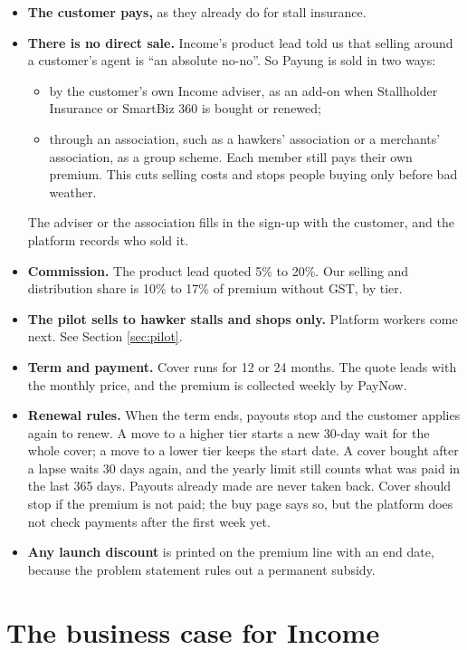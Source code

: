 \documentclass[11pt,a4paper]{article}
\begin{document}
\begin{itemize}[leftmargin=1.2em]
  \item \textbf{The customer pays,} as they already do for stall insurance.
  \item \textbf{There is no direct sale.} Income's product lead told us that selling around a customer's agent is ``an absolute no-no''.\cite{income-qa} So Payung is sold in two ways:
  \begin{itemize}[leftmargin=1.2em]
    \item by the customer's own Income adviser, as an add-on when Stallholder Insurance or SmartBiz 360 is bought or renewed;
    \item through an association, such as a hawkers' association or a merchants' association, as a group scheme. Each member still pays their own premium. This cuts selling costs and stops people buying only before bad weather.
  \end{itemize}
  The adviser or the association fills in the sign-up with the customer, and the platform records who sold it.
  \item \textbf{Commission.} The product lead quoted 5\% to 20\%. Our selling and distribution share is 10\% to 17\% of premium without GST, by tier.\cite{income-qa}
  \item \textbf{The pilot sells to hawker stalls and shops only.} Platform workers come next. See Section \ref{sec:pilot}.
  \item \textbf{Term and payment.} Cover runs for 12 or 24 months. The quote leads with the monthly price, and the premium is collected weekly by PayNow.
  \item \textbf{Renewal rules.} When the term ends, payouts stop and the customer applies again to renew. A move to a higher tier starts a new 30-day wait for the whole cover; a move to a lower tier keeps the start date. A cover bought after a lapse waits 30 days again, and the yearly limit still counts what was paid in the last 365 days. Payouts already made are never taken back. Cover should stop if the premium is not paid; the buy page says so, but the platform does not check payments after the first week yet.
  \item \textbf{Any launch discount} is printed on the premium line with an end date, because the problem statement rules out a permanent subsidy.\cite{ps}
\end{itemize}

\section{The business case for Income}\label{sec:business}
\end{document}

